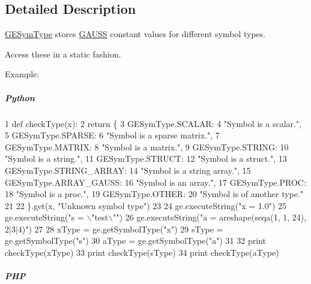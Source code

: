 \subsection{Detailed Description}
\hyperlink{struct_g_e_sym_type}{G\-E\-Sym\-Type} stores \hyperlink{class_g_a_u_s_s}{G\-A\-U\-S\-S} constant values for different symbol types. 

Access these in a static fashion.

Example\-:

\subparagraph*{Python}


\begin{DoxyCode}
1 \textcolor{keyword}{def }checkType(x):
2     \textcolor{keywordflow}{return} \{
3         GESymType.SCALAR:
4             \textcolor{stringliteral}{"Symbol is a scalar."},
5         GESymType.SPARSE:
6             \textcolor{stringliteral}{"Symbol is a sparse matrix."},
7         GESymType.MATRIX:
8             \textcolor{stringliteral}{"Symbol is a matrix."},
9         GESymType.STRING:
10             \textcolor{stringliteral}{"Symbol is a string."},
11         GESymType.STRUCT:
12             \textcolor{stringliteral}{"Symbol is a struct."},
13         GESymType.STRING\_ARRAY:
14             \textcolor{stringliteral}{"Symbol is a string array."},
15         GESymType.ARRAY\_GAUSS:
16             \textcolor{stringliteral}{"Symbol is an array."},
17         GESymType.PROC:
18             \textcolor{stringliteral}{"Symbol is a proc."},
19         GESymType.OTHER:
20             \textcolor{stringliteral}{"Symbol is of another type."}
21 
22         \}.get(x, \textcolor{stringliteral}{"Unknown symbol type"})
23 
24 ge.executeString(\textcolor{stringliteral}{"x = 1.0"})
25 ge.executeString(\textcolor{stringliteral}{"s = \(\backslash\)"test\(\backslash\)""})
26 ge.executeString(\textcolor{stringliteral}{"a = areshape(seqa(1, 1, 24), 2|3|4)"})
27 
28 xType = ge.getSymbolType(\textcolor{stringliteral}{"x"})
29 sType = ge.getSymbolType(\textcolor{stringliteral}{"s"})
30 aType = ge.getSymbolType(\textcolor{stringliteral}{"a"})
31 
32 \textcolor{keywordflow}{print} checkType(xType)
33 \textcolor{keywordflow}{print} checkType(sType)
34 \textcolor{keywordflow}{print} checkType(aType)
\end{DoxyCode}
 \subparagraph*{P\-H\-P}



